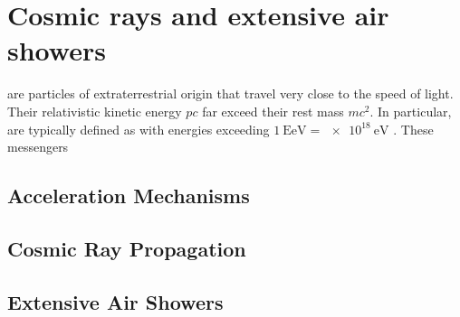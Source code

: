 
\chapter{Cosmic rays and extensive air showers}
\label{chap:cosmic-rays}

\CRs are particles of extraterrestrial origin that travel very close to the 
speed of light. Their relativistic kinetic energy $pc$ far exceed their rest 
mass $mc^2$. In particular, \UHECRs are typically defined as \CRs with energies
exceeding $\SI{1}{\exa\eV} = \SI{e18}{\eV}$ \cite{AlvesBatista2019}. These
messengers 

\section{Acceleration Mechanisms}
\label{sec:cr-accelerators}



\section{Cosmic Ray Propagation}
\label{sec:cr-propagation}



\section{Extensive Air Showers}
\label{sec:extensive-air-showers}



